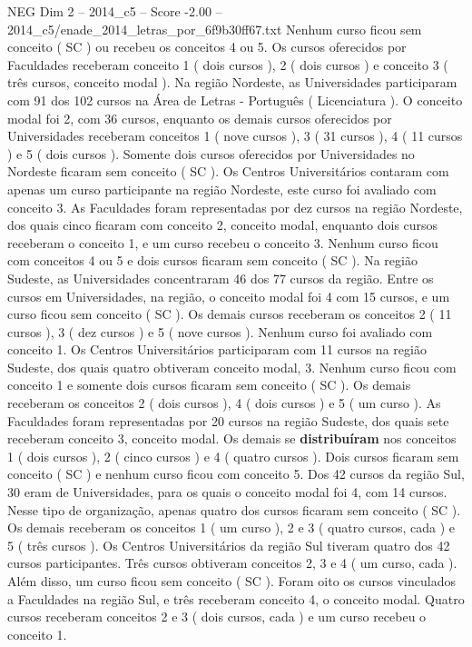 \begin{textsample}{NEG Dim 2 – 2014\_c5 – Score -2.00 – 2014\_c5/enade\_2014\_letras\_por\_6f9b30ff67.txt}
Nenhum curso ficou sem conceito ( SC ) ou recebeu os conceitos 4 ou 5.
Os cursos oferecidos por Faculdades receberam conceito 1 ( dois cursos ), 2 ( dois cursos ) e conceito 3 ( três cursos, conceito modal ).
Na região Nordeste, as Universidades participaram com 91 dos 102 cursos na Área de Letras - Português ( Licenciatura ).
O conceito modal foi 2, com 36 cursos, enquanto os demais cursos oferecidos por Universidades receberam conceitos 1 ( nove cursos ), 3 ( 31 cursos ), 4 ( 11 cursos ) e 5 ( dois cursos ).
Somente dois cursos oferecidos por Universidades no Nordeste ficaram sem conceito ( SC ).
Os Centros Universitários contaram com apenas um curso participante na região Nordeste, este curso foi avaliado com conceito 3.
As Faculdades foram representadas por dez cursos na região Nordeste, dos quais cinco ficaram com conceito 2, conceito modal, enquanto dois cursos receberam o conceito 1, e um curso recebeu o conceito 3.
Nenhum curso ficou com conceitos 4 ou 5 e dois cursos ficaram sem conceito ( SC ).
Na região Sudeste, as Universidades concentraram 46 dos 77 cursos da região.
Entre os cursos em Universidades, na região, o conceito modal foi 4 com 15 cursos, e um curso ficou sem conceito ( SC ).
Os demais cursos receberam os conceitos 2 ( 11 cursos ), 3 ( dez cursos ) e 5 ( nove cursos ).
Nenhum curso foi avaliado com conceito 1.
Os Centros Universitários participaram com 11 cursos na região Sudeste, dos quais quatro obtiveram conceito modal, 3.
Nenhum curso ficou com conceito 1 e somente dois cursos ficaram sem conceito ( SC ).
Os demais receberam os conceitos 2 ( dois cursos ), 4 ( dois cursos ) e 5 ( um curso ).
As Faculdades foram representadas por 20 cursos na região Sudeste, dos quais sete receberam conceito 3, conceito modal.
Os demais se \textbf{distribuíram} nos conceitos 1 ( dois cursos ), 2 ( cinco cursos ) e 4 ( quatro cursos ).
Dois cursos ficaram sem conceito ( SC ) e nenhum curso ficou com conceito 5.
Dos 42 cursos da região Sul, 30 eram de Universidades, para os quais o conceito modal foi 4, com 14 cursos.
Nesse tipo de organização, apenas quatro dos cursos ficaram sem conceito ( SC ).
Os demais receberam os conceitos 1 ( um curso ), 2 e 3 ( quatro cursos, cada ) e 5 ( três cursos ).
Os Centros Universitários da região Sul tiveram quatro dos 42 cursos participantes.
Três cursos obtiveram conceitos 2, 3 e 4 ( um curso, cada ).
Além disso, um curso ficou sem conceito ( SC ).
Foram oito os cursos vinculados a Faculdades na região Sul, e três receberam conceito 4, o conceito modal.
Quatro cursos receberam conceitos 2 e 3 ( dois cursos, cada ) e um curso recebeu o conceito 1.

\end{textsample}
